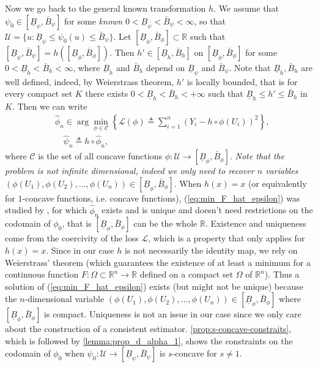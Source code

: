 \documentclass{article} %
\def\eqref#1{equation~\ref{#1}}
\renewcommand{\eqref}[1]{(\ref{#1})}
\begin{document}
Now we go back to the general known transformation $h$. We assume that $\psi_0 \in [\underline{B}_{\psi},\bar{B}_{\psi}]$ for some \emph{known} $0 < \underline{B}_{\psi} < \bar{B}_{\psi} < \infty$, so that $\mathcal{U} = \{u:\underline{B}_{\psi} \leq \psi_0(u) \leq \bar{B}_{\psi}\}$. Let $[\underline{B}_{\phi},\bar{B}_{\phi}]\subset \mathbb{R}$ such that $[\underline{B}_{\psi},\bar{B}_{\psi}]=h([\underline{B}_{\phi},\bar{B}_{\phi}])$. Then $h' \in [\underline{B}_{h},\bar{B}_{h}]$ on $[\underline{B}_{\phi},\bar{B}_{\phi}]$ for some $0<\underline{B}_{h}<\bar{B}_{h}<\infty$, where $\underline{B}_{h}$ and $\bar{B}_{h}$ depend on $\underline{B}_{\psi}$ and $\bar{B}_{\psi}$. Note that $\underline{B}_{h},\bar{B}_{h}$ are well defined, indeed, by Weierstrass theorem, $h'$ is locally bounded, that is for every compact set $K$ there exists $0<\underline{B}_{h}<\bar{B}_{h}<+\infty$ such that $\underline{B}_{h}\leq h' \leq \bar{B}_{h}$ in $K$. Then we can write
\begin{align}\label{eq:min_F_hat_epsilon}
&\widehat{\phi}_n \in \arg \min_{\phi \in \mathcal{C}} \left\{\mathcal{L}(\phi) \triangleq \sum_{i=1}^n\left(Y_i-h \circ \phi \left(U_i\right)\right)^2\right\},\\
&\quad \widehat{\psi}_n \triangleq h \circ \widehat{\phi}_n,\nonumber
\end{align}
where $\mathcal{C}$ is the set of all concave functions $\phi: \mathcal{U} \rightarrow [\underline{B}_{\phi},\bar{B}_{\phi}]$. \emph{Note that the problem is not infinite dimensional, indeed we only need to recover $n$ variables $(\phi(U_1),\phi(U_2), \dots, \phi (U_n)) \in [\underline{B}_{\phi},\bar{B}_{\phi}]$}. When $h(x) = x$ (or equivalently for $1$-concave functions, i.e. concave functions), \eqref{eq:min_F_hat_epsilon} was studied by \cite{dumbgen2004consistency}, for which $\widehat{\phi}_n$ exists and is unique and doesn't need restrictions on the codomain of $\phi_0$, that is $[\underline{B}_{\phi},\bar{B}_{\phi}]$ can be the whole $\mathbb{R}$. Existence and uniqueness come from the coercivity of the loss $\mathcal{L}$, which is a property that only applies for $h(x)=x$. Since in our case $h$ is not necessarily the identity map, we rely on Weierstrass' theorem (which guarantees the existence of at least a minimum for a continuous function $F:\Omega \subset\mathbb{R}^n \to \mathbb{R}$ defined on a compact set $\Omega$ of $\mathbb{R}^n$). Thus a solution of \eqref{eq:min_F_hat_epsilon} exists (but might not be unique) because the $n$-dimensional variable $(\phi(U_1),\phi(U_2), \dots, \phi (U_n)) \in [\underline{B}_{\phi},\bar{B}_{\phi}]$ where $[\underline{B}_{\phi},\bar{B}_{\phi}]$ is compact. Uniqueness is not an issue in our case since we only care about the construction of a consistent estimator. \cref{prop:s-concave-constraits}, which is followed by \cref{lemma:prop_d_alpha_1}, shows the constraints on the codomain of $\phi_0$ when $\psi_0:\mathcal{U}\to [\underline{B}_{\psi},\bar{B}_{\psi}]$ is $s$-concave for $s \neq1$.
\end{document}
